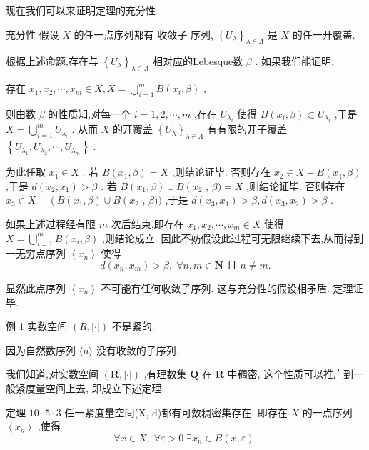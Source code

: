 现在我们可以来证明定理的充分性.

充分性 假设 $X$ 的任一点序列都有 收敛子 序列, ${\left\{  {U}_{\lambda }\right\}  }_{\lambda  \in  \Lambda }$ 是 $X$ 的任一开覆盖.

根据上述命题,存在与 ${\left\{  {U}_{\lambda }\right\}  }_{\lambda  \in  \Lambda }$ 相对应的Lebesque数 $\beta$ . 如果我们能证明:

存在 ${x}_{1},{x}_{2},\cdots ,{x}_{m} \in  X,X = \mathop{\bigcup }\limits_{{i = 1}}^{m}B\left( {{x}_{i},\beta }\right)$ ,

则由数 $\beta$ 的性质知,对每一个 $i = 1,2,\cdots ,m$ ,存在 ${U}_{{\lambda }_{i}}$ 使得 $B\left( {{x}_{i},\beta }\right)  \subset  {U}_{{\lambda }_{i}}$ ,于是 $X = \mathop{\bigcup }\limits_{{i = 1}}^{m}{U}_{{\lambda }_{i}}$ . 从而 $X$ 的开覆盖 ${\left\{  {U}_{\lambda }\right\}  }_{\lambda  \in  \Lambda }$ 有有限的开子覆盖 $\left\{  {{U}_{{\lambda }_{1}},{U}_{{\lambda }_{2}},\cdots ,{U}_{{\lambda }_{m}}}\right\}$ .

为此任取 ${x}_{1} \in  X$ . 若 $B\left( {{x}_{1},\beta }\right)  = X$ ,则结论证毕. 否则存在 ${x}_{2} \in  X - B\left( {{x}_{1},\beta }\right)$ ,于是 $d\left( {{x}_{2},{x}_{1}}\right)  > \beta$ . 若 $B\left( {{x}_{1},\beta }\right)  \cup  B\left( {x}_{2}\right.$ , $\beta ) = X$ ,则结论证毕. 否则存在 ${x}_{3} \in  X - \left( {B\left( {{x}_{1},\beta }\right)  \cup  B\left( {x}_{2}\right. }\right.$ , $\beta ))$ ,于是 $d\left( {{x}_{3},{x}_{1}}\right)  > \beta ,d\left( {{x}_{3},{x}_{2}}\right)  > \beta$ .

如果上述过程经有限 $m$ 次后结束,即存在 ${x}_{1},{x}_{2},\cdots ,{x}_{m} \in  X$ 使得 $X = \mathop{\bigcup }\limits_{{i = 1}}^{m}B\left( {{x}_{i},\beta }\right)$ ,则结论成立. 因此不妨假设此过程可无限继续下去,从而得到一无穷点序列 $\left\langle  {x}_{n}\right\rangle$ 使得
$$d\left( {{x}_{n},{x}_{m}}\right)  > \beta ,\;\forall n,m \in  \mathbf{N}\text{ 且 }n \neq  m.$$

显然此点序列 $\left\langle  {x}_{n}\right\rangle$ 不可能有任何收敛子序列. 这与充分性的假设相矛盾. 定理证毕.

例 1 实数空间 $\left( {R,\left| \cdot \right| }\right)$ 不是紧的.

因为自然数序列 $\langle n\rangle$ 没有收敛的子序列.

我们知道,对实数空间 $\left( {\mathbf{R},\left| \cdot \right| }\right)$ ,有理数集 $\mathbf{Q}$ 在 $\mathbf{R}$ 中稠密, 这个性质可以推广到一般紧度量空间上去, 即成立下述定理.

定理 ${10} \cdot  5 \cdot  3$ 任一紧度量空间(X, d)都有可数稠密集存在, 即存在 $X$ 的一点序列 $\left\langle  {x}_{n}\right\rangle$ ,使得
$$\forall x \in  X,\;\forall \varepsilon  > 0\;\exists {x}_{n} \in  B\left( {x,\varepsilon }\right) .$$

